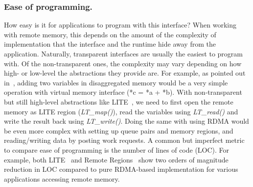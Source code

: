 \subsubsection{Ease of programming.} 
How easy is it for applications to program with this interface? 
When working with remote memory, this depends on the amount of the 
complexity of implementation that the interface and the runtime 
hide away from the application. Naturally, transparent interfaces
are usually the easiest to program with. Of the non-transparent 
ones, the complexity may vary depending on how high- or 
low-level the abstractions they provide are. For example, 
as pointed out in~\cite{Aguilera2017}, 
adding two variables in disaggregated memory
would be a very simple operation with virtual memory interface 
(*c = *a + *b). With non-transparent but still high-level 
abstractions like LITE~\cite{literdma}, we need to first open
the remote memory as LITE region (\textit{LT\_map()}), 
read the variables using \textit{LT\_read()} and 
write the result back using \textit{LT\_write()}.
Doing the same with using RDMA would be even more complex with 
setting up queue pairs and memory regions, and reading/writing 
data by posting work requests. A common but imperfect metric 
to compare ease of programming is the number of lines of code (LOC). 
For example, both LITE~\cite{literdma} and Remote Regions~\cite{remregions} show 
two orders of magnitude reduction in LOC compared to pure 
RDMA-based implementation for various applications accessing 
remote memory.
    


